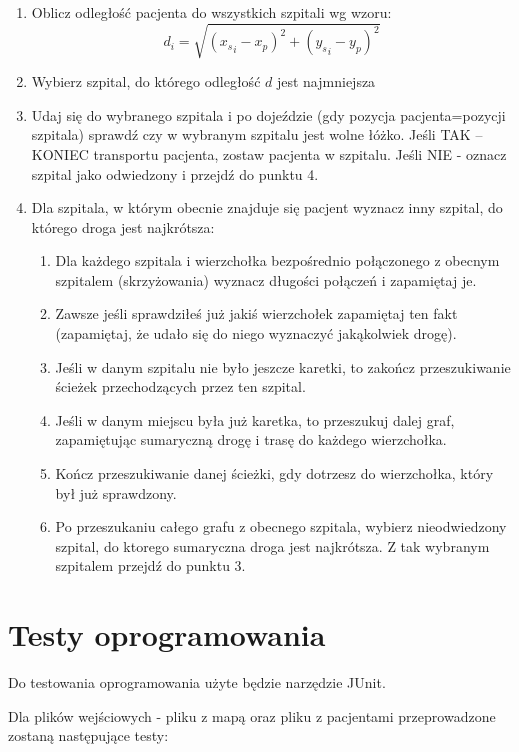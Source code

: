 \documentclass[10pt,a4paper]{article}
\begin{document}
\begin{enumerate}
    \item Oblicz odległość pacjenta do wszystkich szpitali wg wzoru:
    $$d_i=\sqrt{({x_s}_i-x_p)^2+({y_s}_i-y_p)^2}$$
    \item Wybierz szpital, do którego odległość $d$ jest najmniejsza
    \item Udaj się do wybranego szpitala i po dojeździe (gdy pozycja pacjenta=pozycji szpitala) sprawdź czy w wybranym szpitalu jest wolne łóżko. Jeśli TAK – KONIEC transportu pacjenta, zostaw pacjenta w szpitalu. Jeśli NIE - oznacz szpital jako odwiedzony i przejdź do punktu 4.
    \item Dla szpitala, w którym obecnie znajduje się pacjent wyznacz inny szpital, do którego droga jest najkrótsza:
    \begin{enumerate}[4.1.]
        \item Dla każdego szpitala i wierzchołka bezpośrednio połączonego z obecnym szpitalem (skrzyżowania) wyznacz długości połączeń i zapamiętaj je.
        \item Zawsze jeśli sprawdziłeś już jakiś wierzchołek zapamiętaj ten fakt (zapamiętaj, że udało się do niego wyznaczyć jakąkolwiek drogę).
        \item Jeśli w danym szpitalu nie było jeszcze karetki, to zakończ przeszukiwanie ścieżek przechodzących przez ten szpital.
        \item Jeśli w danym miejscu była już karetka, to przeszukuj dalej graf, zapamiętując sumaryczną drogę i trasę do każdego wierzchołka.
        \item Kończ przeszukiwanie danej ścieżki, gdy dotrzesz do wierzchołka, który był już sprawdzony.
        \item Po przeszukaniu całego grafu z obecnego szpitala, wybierz nieodwiedzony szpital, do ktorego sumaryczna droga jest najkrótsza. Z tak wybranym szpitalem przejdź do punktu 3. 
        
    \end{enumerate}
\end{enumerate}

\section{Testy oprogramowania}

Do testowania oprogramowania użyte będzie narzędzie JUnit.

Dla plików wejściowych - pliku z mapą oraz pliku z pacjentami przeprowadzone zostaną następujące testy:
 
\end{document}
